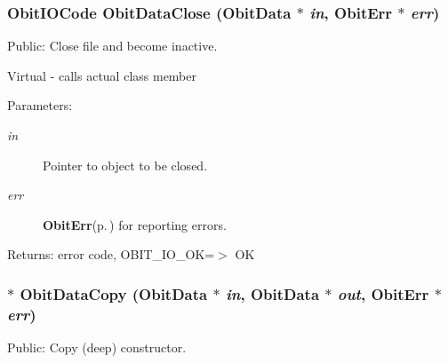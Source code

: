 \subsubsection{\setlength{\rightskip}{0pt plus 5cm}Obit\-IOCode Obit\-Data\-Close ({\bf Obit\-Data} $\ast$ {\em in}, {\bf Obit\-Err} $\ast$ {\em err})}\label{ObitData_8c_a17}


Public: Close file and become inactive. 

Virtual - calls actual class member \begin{Desc}
\item[Parameters:]
\begin{description}
\item[{\em in}]Pointer to object to be closed. \item[{\em err}]{\bf Obit\-Err}{\rm (p.\,\pageref{structObitErr})} for reporting errors. \end{description}
\end{Desc}
\begin{Desc}
\item[Returns:]error code, OBIT\_\-IO\_\-OK=$>$ OK \end{Desc}
\subsubsection{$\ast$ Obit\-Data\-Copy ({\bf Obit\-Data} $\ast$ {\em in}, {\bf Obit\-Data} $\ast$ {\em out}, {\bf Obit\-Err} $\ast$ {\em err})}\label{ObitData_8c_a14}


Public: Copy (deep) constructor. 

